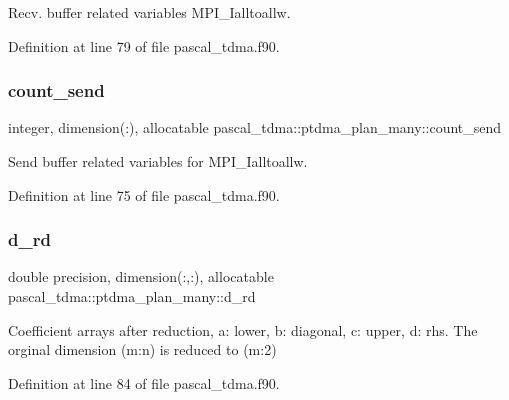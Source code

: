 Recv. buffer related variables M\+P\+I\+\_\+\+Ialltoallw. 



Definition at line 79 of file pascal\+\_\+tdma.\+f90.

\mbox{\label{structpascal__tdma_1_1ptdma__plan__many_ab7a5a4be85650cfe4dfc30fd83b132d7}} 
\subsubsection{\texorpdfstring{count\_send}{count\_send}}
{\footnotesize\ttfamily integer, dimension(\+:), allocatable pascal\+\_\+tdma\+::ptdma\+\_\+plan\+\_\+many\+::count\+\_\+send}



Send buffer related variables for M\+P\+I\+\_\+\+Ialltoallw. 



Definition at line 75 of file pascal\+\_\+tdma.\+f90.

\mbox{\label{structpascal__tdma_1_1ptdma__plan__many_aa1054814f874504a77ad17a838a80fd2}} 
\subsubsection{\texorpdfstring{d\_rd}{d\_rd}}
{\footnotesize\ttfamily double precision, dimension(\+:,\+:), allocatable pascal\+\_\+tdma\+::ptdma\+\_\+plan\+\_\+many\+::d\+\_\+rd}



Coefficient arrays after reduction, a\+: lower, b\+: diagonal, c\+: upper, d\+: rhs. The orginal dimension (m\+:n) is reduced to (m\+:2) 



Definition at line 84 of file pascal\+\_\+tdma.\+f90.

\mbox{\label{structpascal__tdma_1_1ptdma__plan__many_af0941ce4b9206c36a3a059d2bae84d2b}} 
